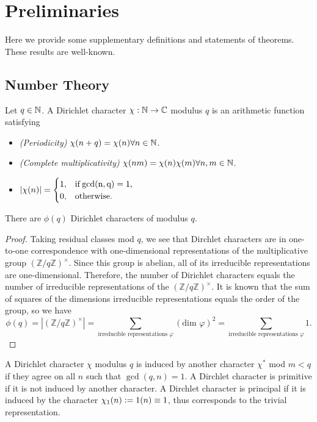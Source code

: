 \section*{Preliminaries}
Here we provide some supplementary definitions and statements of theorems. These results are well-known. 
\subsection*{Number Theory}
\begin{definition}
	\label{dcharacter}
	Let $q\in\mathbb{N}$. A Dirichlet character $\chi:\mathbb{N}\to\mathbb{C}$ modulus $q$ is an arithmetic function satisfying \begin{itemize}
		\item \textit{(Periodicity)} $\chi(n+q)=\chi(n)\forall n\in\mathbb{N}$.
		\item \textit{(Complete multiplicativity)} $\chi(nm)=\chi(n)\chi(m)\forall n,m\in\mathbb{N}$.
		\item $|\chi(n)|=\begin{cases}
			1, & \rm{if }\gcd(n,q)=1,\\
			0, & \rm{otherwise.}
		\end{cases}$
	\end{itemize}
\end{definition}
\begin{proposition}
	There are $\phi(q)$ Dirichlet characters of modulus $q$.
\end{proposition}
\begin{proof}
	Taking residual classes mod $q$, we see that Dirchlet characters are in one-to-one correspondence with one-dimensional representations of the multiplicative group $(\mathbb{Z}/q\mathbb{Z})^{\times}$. Since this group is abelian, all of its irreducible representations are one-dimensional. Therefore, the number of Dirichlet characters equals the number of irreducible representations of the $(\mathbb{Z}/q\mathbb{Z})^{\times}$. It is known that the sum of squares of the dimensions irreducible representations equals the order of the group, so we have \[
		\phi(q)=|(\mathbb{Z}/q\mathbb{Z})^{\times}|=\sum_{\textrm{irreducible representations } \varphi}  (\textrm{dim } \varphi)^2 = \sum_{\textrm{irreducible representations } \varphi}  1.
	\]
\end{proof}
\begin{definition}
	A Dirichlet character $\chi$ modulus $q$ is induced by another character $\chi^*$ mod $m<q$ if they agree on all $n$ such that $\gcd(q,n)=1$. A Dirchlet character is primitive if it is not induced by another character. A Dirchlet character is principal if it is induced by the character $\chi_1(n)\mathrel{\mathop:}=1(n)\equiv 1$, thus corresponds to the trivial representation.
\end{definition}
